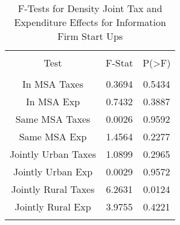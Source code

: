 
\begin{table}[!htbp] \centering 
  \caption{F-Tests for Density Joint Tax and Expenditure Effects for Information Firm Start Ups} 
  \label{51Ftests} 
\begin{tabular}{@{\extracolsep{5pt}} ccc} 
\\[-1.8ex]\hline 
\hline \\[-1.8ex] 
Test & F-Stat & P(\textgreater F) \\ 
\hline \\[-1.8ex] 
In MSA Taxes & 0.3694 & 0.5434 \\ 
In MSA Exp & 0.7432 & 0.3887 \\ 
Same MSA Taxes & 0.0026 & 0.9592 \\ 
Same MSA Exp & 1.4564 & 0.2277 \\ 
Jointly Urban Taxes & 1.0899 & 0.2965 \\ 
Jointly Urban Exp & 0.0029 & 0.9572 \\ 
Jointly Rural Taxes & 6.2631 & 0.0124 \\ 
Jointly Rural Exp & 3.9755 & 0.4221 \\ 
\hline \\[-1.8ex] 
\end{tabular} 
\end{table} 
